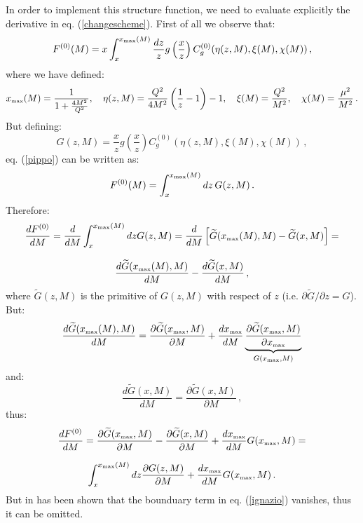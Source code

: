 \documentclass[10pt,a4paper]{article}
\begin{document}
In order to implement this structure function, we need to evaluate explicitly the derivative in eq. (\ref{changescheme}). First of all we observe that:
\begin{equation}\label{pippo}
F^{(0)}(M) = x\int_x^{x_{\mbox{\tiny max}}(M)} \frac{dz}{z}g\left(\frac{x}{z}\right)C_g^{(0)}(\eta(z,M),\xi(M),\chi(M))\,,
\end{equation}
where we have defined:
\begin{equation}
x_{\mbox{\tiny max}}(M)=\frac1{1+\frac{4M^2}{Q^2}},\quad\eta(z,M) = \frac{Q^2}{4M^2}\left(\frac1z-1\right)-1,\quad \xi(M) =\frac{Q^2}{M^2},\quad \chi(M) =\frac{\mu^2}{M^2}\,.
\end{equation}
But defining:
\begin{equation}
G(z,M)=\frac{x}{z}g\left(\frac{x}{z}\right)C_g^{(0)}(\eta(z,M),\xi(M),\chi(M))\,,
\end{equation}
eq. (\ref{pippo}) can be written as:
\begin{equation}
F^{(0)}(M) = \int_x^{x_{\mbox{\tiny max}}(M)} dz\,G(z,M)\,.
\end{equation}
Therefore:
\begin{equation}
\begin{array}{c}
\displaystyle \frac{dF^{(0)}}{dM} = \frac{d}{dM}\int_x^{x_{\mbox{\tiny max}}(M)} dzG(z,M) = \frac{d}{dM}\left[\widetilde{G}(x_{\mbox{\tiny max}}(M),M)-\widetilde{G}(x,M)\right]=\\
\\
\displaystyle \frac{d\widetilde{G}(x_{\mbox{\tiny max}}(M),M)}{dM}-\frac{d\widetilde{G}(x,M)}{dM}\,,
\end{array}
\end{equation}
where $\widetilde{G}(z,M)$ is the primitive of $G(z,M)$ with respect of $z$ (i.e. $\partial\widetilde{G}/\partial z = G$). But:
\begin{equation}
\frac{d\widetilde{G}(x_{\mbox{\tiny max}}(M),M)}{dM} = \frac{\partial \widetilde{G}(x_{\mbox{\tiny max}},M)}{\partial M}+\frac{dx_{\mbox{\tiny max}}}{dM}\underbrace{\frac{\partial \widetilde{G}(x_{\mbox{\tiny max}},M)}{\partial x_{\mbox{\tiny max}}}}_{G(x_{\mbox{\tiny max}},M)}
\end{equation}
and:
\begin{equation}
\frac{d \widetilde{G}(x,M)}{d M}=\frac{\partial\widetilde{G}(x,M)}{\partial M}\,,
\end{equation}
thus:
\begin{equation}\label{ignazio}
\begin{array}{c}
\displaystyle \frac{dF^{(0)}}{dM} = \frac{\partial \widetilde{G}(x_{\mbox{\tiny max}},M)}{\partial M}-\frac{\partial\widetilde{G}(x,M)}{\partial M}+\frac{dx_{\mbox{\tiny max}}}{dM}G(x_{\mbox{\tiny max}},M) =\\
\\
\displaystyle \int_x^{x_{\mbox{\tiny max}}(M)} dz\frac{\partial G(z,M)}{\partial M}+\frac{dx_{\mbox{\tiny max}}}{dM}G(x_{\mbox{\tiny max}},M)\,.
\end{array}
\end{equation}
But in \cite{Alekhin:2010sv} has been shown that the bounduary term in eq. (\ref{ignazio}) vanishes, thus it can be omitted.
\end{document}
